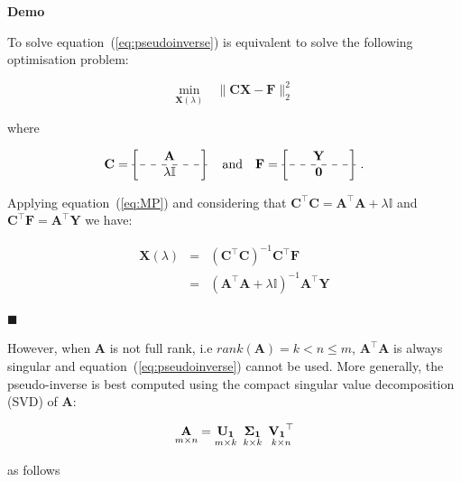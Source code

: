 \textbf{Demo}\quad

To solve equation~(\ref{eq:pseudoinverse}) is equivalent to solve the following
optimisation problem:


\begin{equation}
\label{eq:RRproblem2}
\underset{\mathbf{X}(\lambda)}{\text{min}} \quad \|
\mathbf{C}\mathbf{\mathbf{X}} - \mathbf{F} \|_2^2
\end{equation}

\noindent where

\begin{equation*}
	\mathbf{C}=
	\begin{bmatrix} \quad &\mathbf{A}& \quad \\ \hdashline \quad
& \lambda\mathbb{I}&\quad  
\end{bmatrix} 
\quad \text{and} \quad
	\mathbf{F}=\begin{bmatrix} \quad &\mathbf{Y}& \quad \\ \hdashline \quad
& \mathbf{0}&\quad  \end{bmatrix} \, .
\end{equation*}

Applying equation~(\ref{eq:MP}) and considering that $\mathbf{C}^\top
\mathbf{C} = \mathbf{A}^\top \mathbf{A} + \lambda \mathbb{I}$ and 
$\mathbf{C}^\top \mathbf{F}=\mathbf{A}^\top \mathbf{Y} $ we have:

\begin{eqnarray*}
\mathbf{X}(\lambda)&=&(\mathbf{C}^\top
\mathbf{C})^{-1}\mathbf{C}^\top \mathbf{F} \\
&=& (\mathbf{A}^\top \mathbf{A} + \lambda \mathbb{I})^{-1} \mathbf{A}^\top \mathbf{Y}
\end{eqnarray*}

$\blacksquare$


However, when $\mathbf{A}$ is not full rank, i.e
$rank(\mathbf{A})=k <  n \leq m$, $\mathbf{A}^\top \mathbf{A}$ is
always singular and equation~(\ref{eq:pseudoinverse}) cannot be used.
More generally, the pseudo-inverse is best computed using the compact
singular value decomposition (SVD) of $\mathbf{A}$:

\begin{equation}
    \label{eq:compactsvd}
    \underset{m \times n}{\mathbf{A}}=
    \underset{m \times k}{\mathbf{U_1}} \enskip
    \underset{k \times k}{\mathbf{\Sigma_1}} \enskip
    \underset{k \times n}{\mathbf{V_1}^\top}
\end{equation}

\noindent as follows

